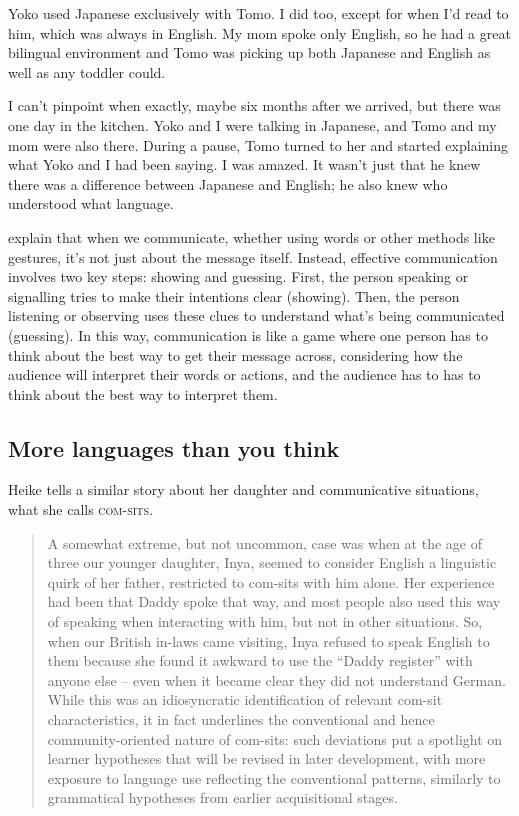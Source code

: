 Yoko used Japanese exclusively with Tomo. I did too, except for when I'd read to him, which was always in English. My mom spoke only English, so he had a great bilingual environment and Tomo was picking up both Japanese and English as well as any toddler could.

I can't pinpoint when exactly, maybe six months after we arrived, but there was one day in the kitchen. Yoko and I were talking in Japanese, and Tomo and my mom were also there. During a pause, Tomo turned to her and started explaining what Yoko and I had been saying. I was amazed. It wasn't just that he knew there was a difference between Japanese and English; he also knew who understood what language.

\citet{Smith2019a} explain that when we communicate, whether using words or other methods like gestures, it's not just about the message itself. Instead, effective communication involves two key steps: showing and guessing. First, the person speaking or signalling tries to make their intentions clear (showing). Then, the person listening or observing uses these clues to understand what's being communicated (guessing). In this way, communication is like a game where one person has to think about the best way to get their message across, considering how the audience will interpret their words or actions, and the audience has to has to think about the best way to interpret them.

\subsection{More languages than you think}

Heike \citet{Wiese2023} tells a similar story about her daughter and communicative situations, what she calls \textsc{com-sits}.

\begin{quote}
    A somewhat extreme, but not uncommon, case was when at the age of three our younger daughter, Inya, seemed to consider English a linguistic quirk of her father, restricted to com-sits with him alone. Her experience had been that Daddy spoke that way, and most people also used this way of speaking when interacting with him, but not in other situations. So, when our British in-laws came visiting, Inya refused to speak English to them because she found it awkward to use the ``Daddy register'' with anyone else -- even when it became clear they did not understand German. While this was an idiosyncratic identification of relevant com-sit characteristics, it in fact underlines the conventional and hence community-oriented nature of com-sits: such deviations put a spotlight on learner hypotheses that will be revised in later development, with more exposure to language use reflecting the conventional patterns, similarly to grammatical hypotheses from earlier acquisitional stages. \hfill\citep[42--43]{Wiese2023}
\end{quote}

